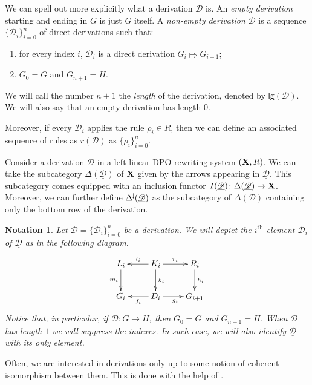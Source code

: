\documentclass[a4paper,UKenglish,cleveref,pdftex, thm-restate,numberwithinsect]{lipics}
\newcommand{\Deltamin}{\Delta^{\hspace{-1pt}\downarrow\hspace{-1pt}}}
\def\R{\mathsf{R}}
\def\X{\textbf {\textup{X}}}
\newcommand{\dder}[1]{\mathscr{#1}}
\newcommand{\der}[1]{\underline{\dder{#1}}}
\newcommand{\lgh}[0]{\mathsf{lg}}
\newtheorem*{notation}{Notation}
\begin{document}
\begin{remark}
We can spell out more explicitly what  a derivation $\dder{D}$ is.  An \emph{empty derivation} starting and ending in $G$ is just $G$ itself.  A \emph{non-empty derivation} $\dder{D}$ is a sequence $\{\dder{D}_i\}_{i=0}^n$ of direct derivations such that:
\begin{enumerate}
	\item for every index $i$, $\dder{D}_i$ is a direct derivation $G_i \Mapsto G_{i+1}$;
	\item $G_0=G$ and $G_{n+1}=H$.
\end{enumerate}

We will call the number $n+1$ the \emph{length} of the derivation, denoted by $\lgh(\der{D})$. We will also say that an empty derivation has length $0$. 

Moreover,  if every $\dder{D}_i$ applies the rule $\rho_i\in R$, then we can define an associated sequence of rules as $r(\der{D})$ as $\{\rho_i\}_{i=0}^n$.
\end{remark}

\begin{remark}\label{rem:func}
	Consider a derivation $\der{D}$ in a left-linear DPO-rewriting system $(\X, \R)$. We can take the subcategory $\Delta(\der{D})$ of $\X$ given by the arrows appearing in $\der{D}$. This subcategory comes equipped with an inclusion functor $I(\der{D})\colon \Delta(\der{D})\to \X$. Moreover, we can further define $\Deltamin(\der{D})$ as the subcategory of $\Delta(\der{D})$ containing only the bottom row of the derivation.
\end{remark}
	
\begin{notation}Let $\der{D}=\{\dder{D}_i\}_{i=0}^n$ be a derivation. We will depict the $i^\text{th}$ element $\dder{D}_i$ of $\der{D}$ as in the following diagram.  
	\[\xymatrix{L_i \ar[d]_{m_i}& K_i \ar[d]^{k_i}\ar[l]_{l_i} \ar[r]^{r_i} & R_i \ar[d]^{h_i} \\G_{i} & \ar[l]^{f_{i}} D_{i} \ar[r]_{g_{i}}& G_{i+1} }\]
	Notice that, in particular, if $\der{D}\colon G\to H$, then $G_0=G$ and $G_{n+1}=H$. When $\der{D}$ has length $1$ we will suppress the indexes. In such case, we will also identify $\der{D}$ with its only element. 
\end{notation} 

Often, we are interested in derivations only up to some notion of coherent isomorphism between them. This is done with the help of .
\end{document}
